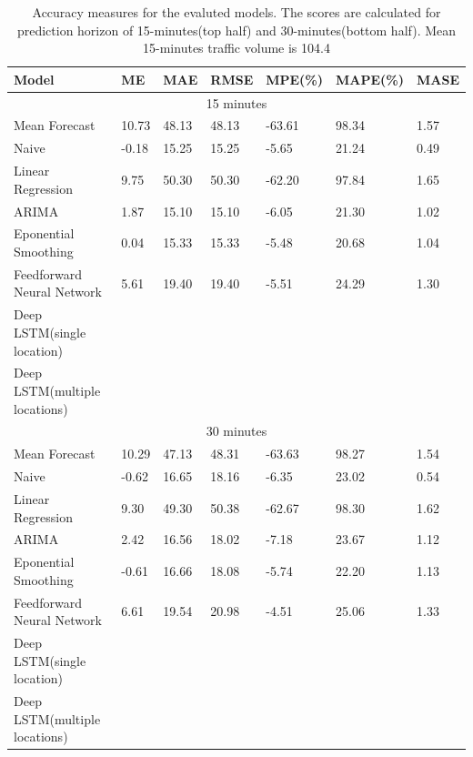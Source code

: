 \begin{table}
\centering
    \begin{tabular}{| l | l | l| l | l | l | l|} \hline
        \textbf{Model}  & \textbf{ME} & \textbf{MAE} & \textbf{RMSE} & \textbf{MPE(\%)} & \textbf{MAPE(\%)} & \textbf{MASE} \\ \hline
        \multicolumn{7}{|c|}{15 minutes} \\ \hline
        Mean Forecast                    & 10.73 & 48.13 & 48.13 & -63.61 & 98.34 & 1.57 \\ \hline
        Naive                            & -0.18 & 15.25 & 15.25 & -5.65 & 21.24 & 0.49 \\ \hline
        Linear Regression                & 9.75 & 50.30 & 50.30 & -62.20 & 97.84 & 1.65 \\ \hline
        ARIMA                            & 1.87 & 15.10 & 15.10 & -6.05 & 21.30 & 1.02 \\ \hline
        Eponential Smoothing             & 0.04 & 15.33 & 15.33 & -5.48 & 20.68 & 1.04 \\ \hline
        Feedforward Neural Network       & 5.61 & 19.40 & 19.40 & -5.51 & 24.29 & 1.30 \\ \hline
        Deep LSTM(single location)       &  &  &  &  &  &  \\ \hline
        Deep LSTM(multiple locations)    &  &  &  &  &  &  \\ \hline
        \multicolumn{7}{|c|}{30 minutes} \\ \hline
        Mean Forecast                    & 10.29 & 47.13 & 48.31 & -63.63 & 98.27 & 1.54 \\ \hline
        Naive                            & -0.62 & 16.65 & 18.16 & -6.35 & 23.02 & 0.54 \\ \hline
        Linear Regression                & 9.30 & 49.30 & 50.38 & -62.67 & 98.30 & 1.62 \\ \hline
        ARIMA                            & 2.42 & 16.56 & 18.02 & -7.18 & 23.67 & 1.12 \\ \hline
        Eponential Smoothing             & -0.61 & 16.66 & 18.08 & -5.74 & 22.20 & 1.13 \\ \hline
        Feedforward Neural Network       & 6.61 & 19.54 & 20.98 & -4.51 & 25.06 & 1.33 \\ \hline
        Deep LSTM(single location)       &  &  &  &  &  &  \\ \hline
        Deep LSTM(multiple locations)    &  &  &  &  &  &  \\ \hline
    \end{tabular}
    \caption[Model comparisons]{Accuracy measures for the evaluted models. The scores are
    calculated for prediction horizon of 15-minutes(top half) and 30-minutes(bottom half). Mean
    15-minutes traffic volume is 104.4}
    \label{table:accuracyScores}
\end{table}

